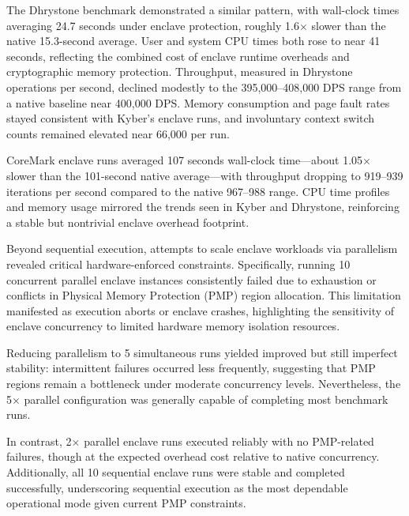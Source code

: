 The Dhrystone benchmark demonstrated a similar pattern, with wall-clock times averaging 24.7 seconds under enclave protection, roughly 1.6$\times$ slower than the native 15.3-second average. User and system CPU times both rose to near 41 seconds, reflecting the combined cost of enclave runtime overheads and cryptographic memory protection. Throughput, measured in Dhrystone operations per second, declined modestly to the 395,000--408,000 DPS range from a native baseline near 400,000 DPS. Memory consumption and page fault rates stayed consistent with Kyber’s enclave runs, and involuntary context switch counts remained elevated near 66,000 per run.

CoreMark enclave runs averaged 107 seconds wall-clock time—about 1.05$\times$ slower than the 101-second native average—with throughput dropping to 919--939 iterations per second compared to the native 967--988 range. CPU time profiles and memory usage mirrored the trends seen in Kyber and Dhrystone, reinforcing a stable but nontrivial enclave overhead footprint.

Beyond sequential execution, attempts to scale enclave workloads via parallelism revealed critical hardware-enforced constraints. Specifically, running 10 concurrent parallel enclave instances consistently failed due to exhaustion or conflicts in Physical Memory Protection (PMP) region allocation. This limitation manifested as execution aborts or enclave crashes, highlighting the sensitivity of enclave concurrency to limited hardware memory isolation resources.

Reducing parallelism to 5 simultaneous runs yielded improved but still imperfect stability: intermittent failures occurred less frequently, suggesting that PMP regions remain a bottleneck under moderate concurrency levels. Nevertheless, the 5$\times$ parallel configuration was generally capable of completing most benchmark runs.

In contrast, 2$\times$ parallel enclave runs executed reliably with no PMP-related failures, though at the expected overhead cost relative to native concurrency. Additionally, all 10 sequential enclave runs were stable and completed successfully, underscoring sequential execution as the most dependable operational mode given current PMP constraints.


